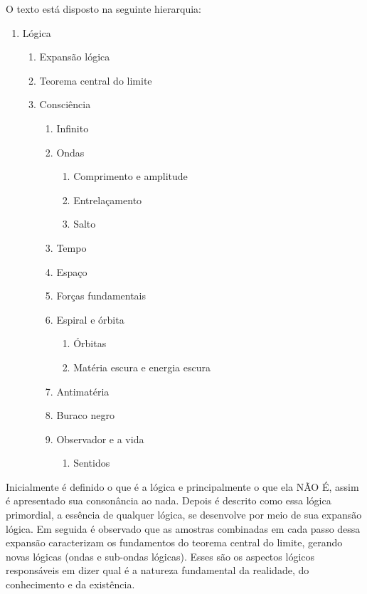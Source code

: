 \noindent O texto está disposto na seguinte hierarquia:
	\begin{enumerate}[label*=\arabic*.]
	   \item Lógica
	   \begin{enumerate}[label*=\arabic*.]
		   \item Expansão lógica
		   \item Teorema central do limite
		   \item Consciência
			   \begin{enumerate}[label*=\arabic*.]
				   \item Infinito
				   \item Ondas 
				   \begin{enumerate}[label*=\arabic*.]
				   		\item Comprimento e amplitude
				   		\item Entrelaçamento
				   		\item Salto
				   \end{enumerate}  
				   \item Tempo
				   \item Espaço 
				   \item Forças fundamentais
				   \item Espiral e órbita
				   \begin{enumerate}[label*=\arabic*.]
					   \item Órbitas
				   		\item Matéria escura e energia escura
				   \end{enumerate} 
				   \item Antimatéria
				   \item Buraco negro
				   \item Observador e a vida
				   \begin{enumerate}[label*=\arabic*.]
				   		\item Sentidos
				   \end{enumerate}  
			   \end{enumerate}   
	   \end{enumerate}
	\end{enumerate}

Inicialmente é definido o que é a lógica e principalmente o que ela NÃO É, assim é apresentado sua consonância ao nada. Depois é descrito como essa lógica primordial, a essência de qualquer lógica, se desenvolve por meio de sua expansão lógica. Em seguida é observado que as amostras combinadas em cada passo dessa expansão caracterizam os fundamentos do teorema central do limite, gerando novas lógicas (ondas e sub-ondas lógicas). Esses são os aspectos lógicos responsáveis em dizer qual é a natureza fundamental da realidade, do conhecimento e da existência. 

\bigbreak